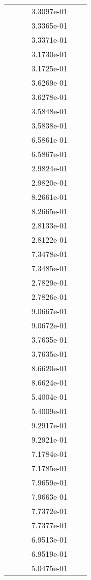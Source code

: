 \begin{xltabular}{\textwidth}{r|rS[table-format=1.3e+2]S[table-format=1.4e+2]S[table-format=1.4e+2]S[table-format=-1.5]}
&  &  & 3.3097e-01 & & \\
&  &  & 3.3365e-01 & & \\
&  &  & 3.3371e-01 & & \\
&  &  & 3.1730e-01 & & \\
&  &  & 3.1725e-01 & & \\
&  &  & 3.6269e-01 & & \\
&  &  & 3.6278e-01 & & \\
&  &  & 3.5848e-01 & & \\
&  &  & 3.5838e-01 & & \\
&  &  & 6.5861e-01 & & \\
&  &  & 6.5867e-01 & & \\
&  &  & 2.9824e-01 & & \\
&  &  & 2.9820e-01 & & \\
&  &  & 8.2661e-01 & & \\
&  &  & 8.2665e-01 & & \\
&  &  & 2.8133e-01 & & \\
&  &  & 2.8122e-01 & & \\
&  &  & 7.3478e-01 & & \\
&  &  & 7.3485e-01 & & \\
&  &  & 2.7829e-01 & & \\
&  &  & 2.7826e-01 & & \\
&  &  & 9.0667e-01 & & \\
&  &  & 9.0672e-01 & & \\
&  &  & 3.7635e-01 & & \\
&  &  & 3.7635e-01 & & \\
&  &  & 8.6620e-01 & & \\
&  &  & 8.6624e-01 & & \\
&  &  & 5.4004e-01 & & \\
&  &  & 5.4009e-01 & & \\
&  &  & 9.2917e-01 & & \\
&  &  & 9.2921e-01 & & \\
&  &  & 7.1784e-01 & & \\
&  &  & 7.1785e-01 & & \\
&  &  & 7.9659e-01 & & \\
&  &  & 7.9663e-01 & & \\
&  &  & 7.7372e-01 & & \\
&  &  & 7.7377e-01 & & \\
&  &  & 6.9513e-01 & & \\
&  &  & 6.9519e-01 & & \\
&  &  & 5.0475e-01 & & \\

\end{xltabular}
